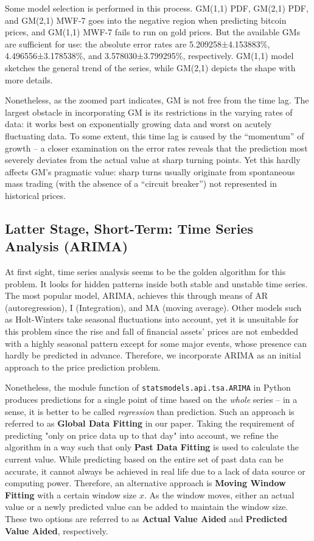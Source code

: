 \documentclass{mcmthesis}
\begin{document}
{	Some model selection is performed in this process. GM(1,1) PDF, GM(2,1) PDF, and GM(2,1) MWF-7 goes into the negative region when predicting bitcoin prices, and GM(1,1) MWF-7 fails to run on gold prices. But the available GMs are sufficient for use: the absolute error rates are 5.209258±4.153883\%, 4.496556±3.178538\%, and 3.578030±3.799295\%, respectively. GM(1,1) model sketches the general trend of the series, while GM(2,1) depicts the shape with more details. 
	
	Nonetheless, as the zoomed part indicates, GM is not free from the time lag. The largest obstacle in incorporating GM is its restrictions in the varying rates of data: it works best on exponentially growing data and worst on acutely fluctuating data. To some extent, this time lag is caused by the ``momentum'' of growth -- a closer examination on the error rates reveals that the prediction most severely deviates from the actual value at sharp turning points. Yet this hardly affects GM's pragmatic value: sharp turns usually originate from spontaneous mass trading (with the absence of a ``circuit breaker'') not represented in historical prices. 
	
	\subsection{Latter Stage, Short-Term: Time Series Analysis (ARIMA)}
	\label{sec:3.1}
	
	At first sight, time series analysis seems to be the golden algorithm for this problem. It looks for hidden patterns inside both stable and unstable time series. The most popular model, ARIMA, achieves this through means of AR (autoregression), I (Integration), and MA (moving average). Other models such as Holt-Winters take seasonal fluctuations into account, yet it is unsuitable for this problem since the rise and fall of financial assets' prices are not embedded with a highly seasonal pattern except for some major events, whose presence can hardly be predicted in advance. Therefore, we incorporate ARIMA as an initial approach to the price prediction problem. 
	
	Nonetheless, the module function of \verb|statsmodels.api.tsa.ARIMA| in Python produces predictions for a single point of time based on the \textit{whole} series -- in a sense, it is better to be called \textit{regression} than prediction. Such an approach is referred to as \textbf{Global Data Fitting} in our paper. Taking the requirement of predicting "only on price data up to that day" into account, we refine the algorithm in a way such that only \textbf{Past Data Fitting} is used to calculate the current value. While predicting based on the entire set of past data can be accurate, it cannot always be achieved in real life due to a lack of data source or computing power. Therefore, an alternative approach is \textbf{Moving Window Fitting} with a certain window size $x$. As the window moves, either an actual value or a newly predicted value can be added to maintain the window size. These two options are referred to as \textbf{Actual Value Aided} and \textbf{Predicted Value Aided}, respectively. 
	
}
\end{document}
